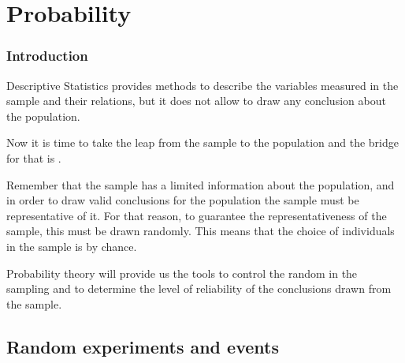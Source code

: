 \section{Probability}



\begin{frame}
\frametitle{Introduction}
Descriptive Statistics provides methods to describe the variables measured in the sample and their relations, but it does not allow to draw any conclusion about the population.

Now it is time to take the leap from the sample to the population and the bridge for that is
.

Remember that the sample has a limited information about the population, and in order to draw valid conclusions for the
population the sample must be representative of it.
For that reason, to guarantee the representativeness of the sample, this must be drawn randomly. 
This means that the choice of individuals in the sample is by chance. 

Probability theory will provide us the tools to control the random in the sampling and to determine the level of
reliability of the conclusions drawn from the sample. 
\end{frame}


\subsection{Random experiments and events}

